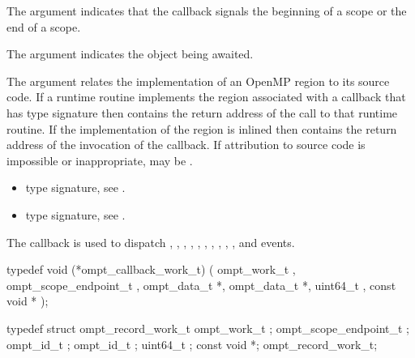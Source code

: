 \argdesc

The  argument indicates that the callback signals
the beginning of a scope or the end of a scope.

The argument  indicates the object being awaited.

The  argument relates the implementation of an OpenMP region
to its source code. If a runtime routine implements the region associated with
a callback that has type signature  then
 contains the return address of the call to that runtime routine.
If the implementation of the region is inlined then  contains the
return address of the invocation of the callback. If attribution to source code
is impossible or inappropriate, may be .

\crossreferences
\begin{itemize}
\item {} type signature, see
.
\item {} type signature, see
.
\end{itemize}



\label{sec:ompt_callback_work_t}
\summary
The  callback is used to dispatch
, ,
, ,
, ,
, ,
, ,
 and  events.

\format

\begin{ccppspecific}
\begin{omptCallback}
typedef void (*ompt_callback_work_t) (
  ompt_work_t ,
  ompt_scope_endpoint_t ,
  ompt_data_t *,
  ompt_data_t *,
  uint64_t ,
  const void *
);
\end{omptCallback}
\end{ccppspecific}


\record

\begin{ccppspecific}
\begin{omptRecord}
typedef struct ompt_record_work_t {
  ompt_work_t ;
  ompt_scope_endpoint_t ;
  ompt_id_t ;
  ompt_id_t ;
  uint64_t ;
  const void *;
} ompt_record_work_t;
\end{omptRecord}
\end{ccppspecific}


